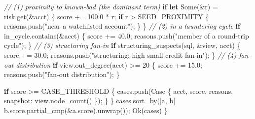 \documentclass[
  11pt,
  openany]{book}
\newenvironment{Shaded}{}{}
\newcommand{\CommentTok}[1]{\textcolor[rgb]{0.38,0.63,0.69}{\textit{#1}}}
\newcommand{\ConstantTok}[1]{\textcolor[rgb]{0.53,0.00,0.00}{#1}}
\newcommand{\ControlFlowTok}[1]{\textcolor[rgb]{0.00,0.44,0.13}{\textbf{#1}}}
\newcommand{\DecValTok}[1]{\textcolor[rgb]{0.25,0.63,0.44}{#1}}
\newcommand{\KeywordTok}[1]{\textcolor[rgb]{0.00,0.44,0.13}{\textbf{#1}}}
\newcommand{\NormalTok}[1]{#1}
\newcommand{\OperatorTok}[1]{\textcolor[rgb]{0.40,0.40,0.40}{#1}}
\newcommand{\StringTok}[1]{\textcolor[rgb]{0.25,0.44,0.63}{#1}}
\begin{document}
\begin{Shaded}
\begin{Highlighting}[]
        \CommentTok{// (1) proximity to known{-}bad (the dominant term)}
        \ControlFlowTok{if} \KeywordTok{let} \ConstantTok{Some}\NormalTok{(}\OperatorTok{\&}\NormalTok{r) }\OperatorTok{=}\NormalTok{ risk}\OperatorTok{.}\NormalTok{get(}\OperatorTok{\&}\NormalTok{acct) }\OperatorTok{\{}
\NormalTok{            score }\OperatorTok{+=} \DecValTok{100.0} \OperatorTok{*}\NormalTok{ r}\OperatorTok{;}
            \ControlFlowTok{if}\NormalTok{ r }\OperatorTok{\textgreater{}}\NormalTok{ SEED\_PROXIMITY }\OperatorTok{\{}\NormalTok{ reasons}\OperatorTok{.}\NormalTok{push(}\StringTok{"near a watchlisted account"}\NormalTok{)}\OperatorTok{;} \OperatorTok{\}}
        \OperatorTok{\}}
        \CommentTok{// (2) in a laundering cycle}
        \ControlFlowTok{if}\NormalTok{ in\_cycle}\OperatorTok{.}\NormalTok{contains(}\OperatorTok{\&}\NormalTok{acct) }\OperatorTok{\{}
\NormalTok{            score }\OperatorTok{+=} \DecValTok{40.0}\OperatorTok{;}\NormalTok{ reasons}\OperatorTok{.}\NormalTok{push(}\StringTok{"member of a round{-}trip cycle"}\NormalTok{)}\OperatorTok{;}
        \OperatorTok{\}}
        \CommentTok{// (3) structuring fan{-}in}
        \ControlFlowTok{if}\NormalTok{ structuring\_suspects(sql}\OperatorTok{,} \OperatorTok{\&}\NormalTok{view}\OperatorTok{,}\NormalTok{ acct) }\OperatorTok{\{}
\NormalTok{            score }\OperatorTok{+=} \DecValTok{30.0}\OperatorTok{;}\NormalTok{ reasons}\OperatorTok{.}\NormalTok{push(}\StringTok{"structuring: high small{-}credit fan{-}in"}\NormalTok{)}\OperatorTok{;}
        \OperatorTok{\}}
        \CommentTok{// (4) fan{-}out distribution}
        \ControlFlowTok{if}\NormalTok{ view}\OperatorTok{.}\NormalTok{out\_degree(acct) }\OperatorTok{\textgreater{}=} \DecValTok{20} \OperatorTok{\{}
\NormalTok{            score }\OperatorTok{+=} \DecValTok{15.0}\OperatorTok{;}\NormalTok{ reasons}\OperatorTok{.}\NormalTok{push(}\StringTok{"fan{-}out distribution"}\NormalTok{)}\OperatorTok{;}
        \OperatorTok{\}}

        \ControlFlowTok{if}\NormalTok{ score }\OperatorTok{\textgreater{}=}\NormalTok{ CASE\_THRESHOLD }\OperatorTok{\{}
\NormalTok{            cases}\OperatorTok{.}\NormalTok{push(Case }\OperatorTok{\{}\NormalTok{ acct}\OperatorTok{,}\NormalTok{ score}\OperatorTok{,}\NormalTok{ reasons}\OperatorTok{,}\NormalTok{ snapshot}\OperatorTok{:}\NormalTok{ view}\OperatorTok{.}\NormalTok{node\_count() }\OperatorTok{\}}\NormalTok{)}\OperatorTok{;}
        \OperatorTok{\}}
    \OperatorTok{\}}
\NormalTok{    cases}\OperatorTok{.}\NormalTok{sort\_by(}\OperatorTok{|}\NormalTok{a}\OperatorTok{,}\NormalTok{ b}\OperatorTok{|}\NormalTok{ b}\OperatorTok{.}\NormalTok{score}\OperatorTok{.}\NormalTok{partial\_cmp(}\OperatorTok{\&}\NormalTok{a}\OperatorTok{.}\NormalTok{score)}\OperatorTok{.}\NormalTok{unwrap())}\OperatorTok{;}
    \ConstantTok{Ok}\NormalTok{(cases)}
\OperatorTok{\}}
\end{Highlighting}
\end{Shaded}
\end{document}
